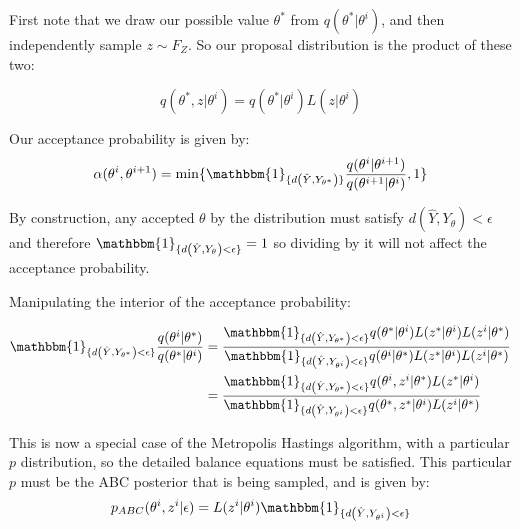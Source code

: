 \documentclass[12pt]{paper}
\newcommand{\met}[1]{d \left ( #1 \right )}
\newcommand{\indicate}[1]{ \mathbbm{1}_{\{#1\}}}
\begin{document}
First note that we draw our possible value $\theta^{*}$ from $q( \theta^{*} \vert
\theta^i )$, and then independently sample $z \sim F_Z$. So our proposal
distribution is the product of these two:

\begin{equation*}
  q( \theta^{*}, z \vert \theta^i) = q(\theta^{*} \vert \theta^i) L( z \vert \theta^i)
\end{equation*}

Our acceptance probability is given by:
\begin{equation*}
  \alpha( \theta^i, \theta^{i+1}) = \min\{ \indicate{ \met{\hat{Y}, Y_{\theta^{*}}} }
  \frac{ q( \theta^{i} \vert \theta^{i+1})}{ q( \theta^{i+1} \vert \theta^i)} ,  1\}
\end{equation*}


By construction, any accepted $\theta$ by the distribution must satisfy
$\met{\hat{Y}, Y_{\theta}} < \epsilon$ and therefore
$\indicate{\met{\hat{Y}, Y_{\theta}} < \epsilon} = 1$ so dividing by it will not
affect the acceptance probability.

Manipulating the interior of the acceptance probability:

\begin{align*}
  \indicate{\met{\hat{Y},Y_{\theta^{*}}} < \epsilon} \frac{q(\theta^i \vert \theta^{*})}{q(\theta^{*}
  \vert \theta^i)} &= \frac{\indicate{\met{\hat{Y},Y_{\theta^{*}}} < \epsilon}
            q(\theta^{*} \vert \theta^i) L(z^{*} \vert \theta^i) L( z^i \vert
            \theta^{*})}{\indicate{\met{\hat{Y}, Y_{\theta^i}} < \epsilon} q(
            \theta^i \vert \theta^{*}) L(z^{*} \vert \theta^i) L( z^i \vert \theta^{*}) }\\
          &= \frac{\indicate{\met{\hat{Y},Y_{\theta^{*}}} < \epsilon}
            q(\theta^i, z^i \vert \theta^{*}) L(z^{*} \vert \theta^i)
            }{\indicate{\met{\hat{Y}, Y_{\theta^i}} < \epsilon} q( 
            \theta^{*}, z^{*} \vert \theta^i) L( z^i \vert \theta^{*}) }\\
\end{align*}

This is now a special case of the Metropolis Hastings algorithm, with
a particular $p$ distribution, so the detailed balance equations must
be satisfied. This particular $p$ must be the ABC posterior that is
being sampled, and is given by:
\begin{equation*}
  p_{ABC}( \theta^i, z^i \vert \epsilon ) = L(z^i \vert \theta^i) \indicate{ \met{\hat{Y}, Y_{\theta^i}}<\epsilon}
\end{equation*}
\end{document}
